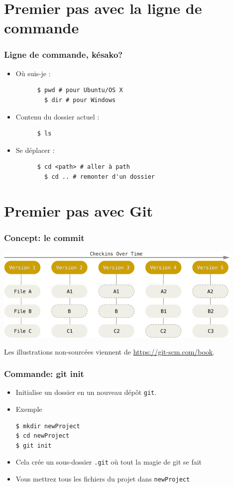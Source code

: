 \documentclass{beamer}
\begin{document}
\section{Premier pas avec la ligne de commande}

\begin{frame}
\frametitle{Ligne de commande, késako?}
\begin{itemize}
    \item Où suis-je :
    \begin{lstlisting}
      $ pwd # pour Ubuntu/OS X
        $ dir # pour Windows
    \end{lstlisting}
    \item Contenu du dossier actuel :
    \begin{lstlisting}
      $ ls
    \end{lstlisting}
    \item Se déplacer :
    \begin{lstlisting}
      $ cd <path> # aller à path
        $ cd .. # remonter d'un dossier
    \end{lstlisting}
\end{itemize}
\end{frame}

\section{Premier pas avec Git}

\begin{frame}
\frametitle{Concept: le \textbf{commit}}

\begin{center}
    \includegraphics[width=0.9\textwidth]{img/commits.png}
\end{center}
\footnotesize{Les illustrations non-sourcées viennent de \url{https://git-scm.com/book}.}
\end{frame}

\begin{frame}[fragile]
\frametitle{Commande: git init}
\begin{itemize}
\item Initialise un dossier en un nouveau dépôt \texttt{git}.
\item Exemple
\begin{lstlisting}
$ mkdir newProject
$ cd newProject
$ git init
\end{lstlisting}
\item Cela crée un sous-dossier \texttt{.git} où tout la magie de git se fait
\item Vous mettrez tous les fichiers du projet dans \texttt{newProject}
\end{itemize}
\end{frame}
\end{document}
